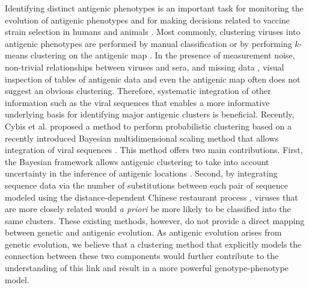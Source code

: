 \documentclass[11pt,oneside,letterpaper]{article}
\begin{document}
Identifying distinct antigenic phenotypes is an important task for monitoring the evolution of antigenic phenotypes and for making decisions related to vaccine strain selection in humans and animals \cite{smith_mapping_2004, fouchier_use_2010}.
Most commonly, clustering viruses into antigenic phenotypes are performed by manual classification or by performing $k$-means clustering on the antigenic map \cite{smith_mapping_2004}. 
In the presence of measurement noise, non-trivial relationships between viruses and sera, and missing data \cite{cai_computational_2010}, visual inspection of tables of antigenic data and even the antigenic map often does not suggest an obvious clustering. 
Therefore, systematic integration of other information such as the viral sequences that enables a more informative underlying basis for identifying major antigenic clusters is beneficial.
Recently, Cybis et al. \cite{cybis_bayesian_2015} proposed a method to perform probabilistic clustering based on a recently introduced Bayesian multidimensional scaling method \cite{oh_bayesian_2001} that allows integration of viral sequences \cite{bedford_integrating_2014}. 
This method offers two main contributions. 
First, the Bayesian framework allows antigenic clustering to take into account uncertainty in the inference of antigenic locations \cite{bedford_integrating_2014}.
Second, by integrating sequence data via the number of substitutions between each pair of sequence modeled using the distance-dependent Chinese restaurant process \cite{blei_distance_2011}, viruses that are more closely related would \textit{a priori} be more likely to be classified into the same clusters. 
These existing methods, however, do not provide a direct mapping between genetic and antigenic evolution. 
As antigenic evolution arises from genetic evolution, we believe that a clustering method that explicitly models the connection between these two components would further contribute to the understanding of this link and result in a more powerful genotype-phenotype model.
\end{document}
